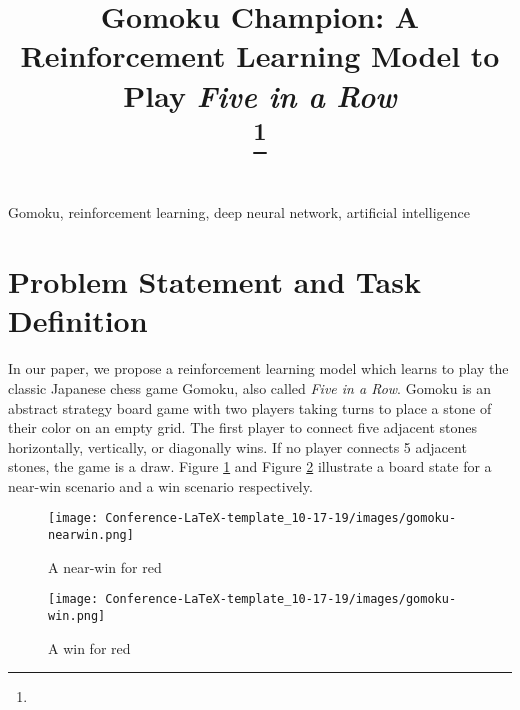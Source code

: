 \documentclass[conference]{IEEEtran}
\begin{document}
\title{Gomoku Champion: A Reinforcement Learning Model to Play \textit{Five in a Row}\\
{}
\thanks{}
}

\author{
\and
{}
}

\maketitle

\begin{IEEEkeywords}
Gomoku, reinforcement learning, deep neural network, artificial intelligence
\end{IEEEkeywords}

\section{Problem Statement and Task Definition}
 In our paper, we propose a reinforcement learning model which learns to play the classic Japanese chess game Gomoku, also called \textit{Five in a Row}. Gomoku is an abstract strategy board game with two players taking turns to place a stone of their color on an empty grid. The first player to connect five adjacent stones horizontally, vertically, or diagonally wins. If no player connects 5 adjacent stones, the game is a draw. Figure \ref{gomoku-near-win} and Figure \ref{gomoku-win} illustrate a board state for a near-win scenario and a win scenario respectively.
 
 \begin{figure}[h]
    \centering
    \texttt{[image: Conference-LaTeX-template\_10-17-19/images/gomoku-nearwin.png]}
    \caption{A near-win for red}
    \label{gomoku-near-win}
\end{figure}

\begin{figure}[h]
    \centering
    \texttt{[image: Conference-LaTeX-template\_10-17-19/images/gomoku-win.png]}
    \caption{A win for red}
    \label{gomoku-win}
\end{figure}
 
\end{document}
